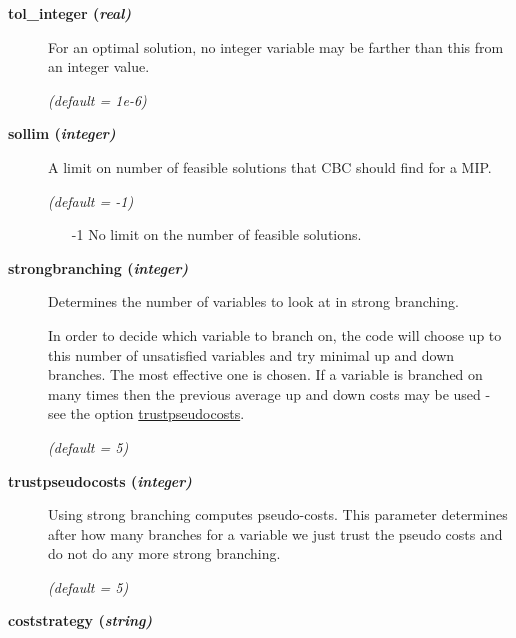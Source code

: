 \begin{description}

\item[\label{tol_integer}\hypertarget{tol_integer}
{\textbf{tol\_integer (\slshape{real})}}]\hspace{1.0in}

For an optimal solution, no integer variable may be farther than this from an integer value.

\textsl{(default = 1e-6)}

\item[\label{sollim}\hypertarget{sollim}
{\textbf{sollim (\slshape{integer})}}]\hspace{1.0in}

A limit on number of feasible solutions that CBC should find for a MIP.

\textsl{(default = -1)}
\begin{itemize}
\item[-1] 
No limit on the number of feasible solutions.
\end{itemize}

\item[\label{strongbranching}\hypertarget{strongbranching}
{\textbf{strongbranching (\slshape{integer})}}]\hspace{1.0in}

Determines the number of variables to look at in strong branching.

In order to decide which variable to branch on, the code will choose up to this number of unsatisfied variables and try minimal up and down branches.
The most effective one is chosen.
If a variable is branched on many times then the previous average up and down costs may be used - see the option \hyperlink{trustpseudocosts}{trustpseudocosts}.

\textsl{(default = 5)}

\item[\label{trustpseudocosts}\hypertarget{trustpseudocosts}
{\textbf{trustpseudocosts (\slshape{integer})}}]\hspace{1.0in}

Using strong branching computes pseudo-costs.
This parameter determines after how many branches for a variable we just trust the pseudo costs and do not do any more strong branching.

\textsl{(default = 5)}

\item[\label{coststrategy}\hypertarget{coststrategy}
{\textbf{coststrategy (\slshape{string})}}]\hspace{1.0in}


\end{description}
